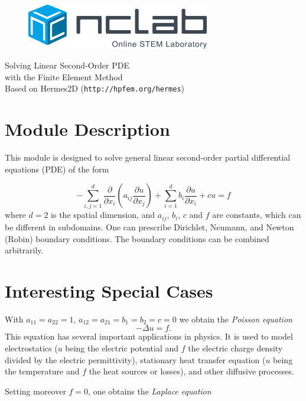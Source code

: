\documentclass{article}
\begin{document}
\large

\vbox{}
\vspace{-2cm}
\begin{figure}[!ht]
\includegraphics[width=8cm]{img/logo.png}
\vspace{4mm}
\end{figure}
\noindent
\begin{center}
{\Huge Solving Linear Second-Order PDE\\ with the Finite Element Method}\\[3mm]
Based on Hermes2D ({\tt http://hpfem.org/hermes})\\[6mm]
\end{center}
\section{Module Description}

This module is designed to solve general linear second-order
partial differential equations (PDE) of the form 

$$
-\sum_{i, j = 1}^d \frac{\partial}{\partial x_i} \left(a_{ij}
 \frac{\partial u}{\partial x_j}  \right) + \sum_{i=1}^d b_i \frac{\partial u}{\partial x_i}
+ cu = f 
$$  
where $d=2$ is the spatial dimension, and $a_{ij}$, $b_i$, $c$ and $f$ are constants,
which can be different in subdomains. One can prescribe Dirichlet, Neumann, and Newton 
(Robin) boundary conditions. The boundary conditions can be combined arbitrarily. 

\section{Interesting Special Cases}

With $a_{11} = a_{22} = 1$, $a_{12} = a_{21} = b_1 = b_2 = c = 0$ we obtain 
the {\em Poisson equation} 
$$
-\Delta u = f.
$$ 
This equation has several important applications 
in physics. It is used to model electrostatics ($u$ being the electric 
potential and $f$ the electric charge density divided by the electric permittivity), 
stationary heat transfer equation ($u$ being the temperature and $f$ the heat 
sources or losses), and other diffusive processes.

Setting moreover $f = 0$, one obtains the {\em Laplace equation}
\end{document}
